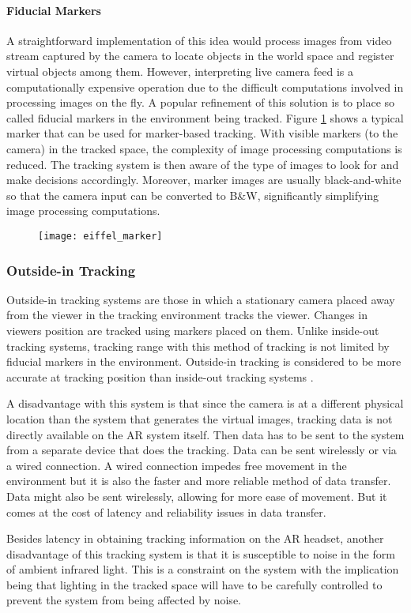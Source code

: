 \paragraph{Fiducial Markers}
A straightforward implementation of this idea would process images from video stream captured by the camera to locate objects in the world space and register virtual objects among them. However, interpreting live camera feed is a computationally expensive operation due to the difficult computations involved in processing images on the fly. A popular refinement of this solution is to place so called fiducial markers in the environment being tracked. Figure \ref{fig:eiffel_marker} shows a typical marker that can be used for marker-based tracking. With visible markers (to the camera) in the tracked space, the complexity of image processing computations is reduced. The tracking system is then aware of the type of images to look for and make decisions accordingly. Moreover, marker images are usually black-and-white so that the camera input can be converted to B\&W, significantly simplifying image processing computations.

\begin{figure}
	\centering
	\texttt{[image: eiffel\_marker]}
	\caption{}
	\label{fig:eiffel_marker}
\end{figure}

\subsubsection{Outside-in Tracking}
Outside-in tracking systems are those in which a stationary camera placed away from the viewer in the tracking environment tracks the viewer. Changes in viewers position are tracked using markers placed on them. Unlike inside-out tracking systems, tracking range with this method of tracking is not limited by fiducial markers in the environment. Outside-in tracking is considered to be more accurate at tracking position than inside-out tracking systems \parencite{klein2006visual}.

A disadvantage with this system is that since the camera is at a different physical location than the system that generates the virtual images, tracking data is not directly available on the AR system itself. Then data has to be sent to the system from a separate device that does the tracking. Data can be sent wirelessly or via a wired connection. A wired connection impedes free movement in the environment but it is also the faster and more reliable method of data transfer. Data might also be sent wirelessly, allowing for more ease of movement. But it comes at the cost of latency and reliability issues in data transfer. 

Besides latency in obtaining tracking information on the AR headset, another disadvantage of this tracking system is that it is susceptible to noise in the form of ambient infrared light. This is a constraint on the system with the implication being that lighting in the tracked space will have to be carefully controlled to prevent the system from being affected by noise.
